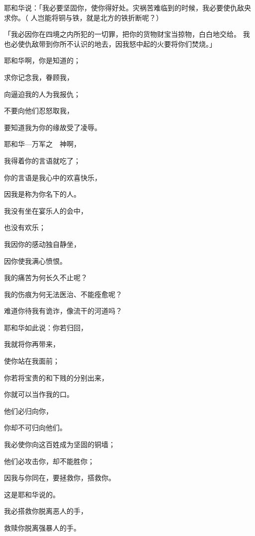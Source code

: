 {耶和华说：「我必要坚固你，使你得好处。灾祸苦难临到的时候，我必要使仇敌央求你。（
人岂能将铜与铁，就是北方的铁折断呢？）
\par }{\PP {}「我必因你在四境之内所犯的一切罪，把你的货物财宝当掠物，白白地交给{}。
我也必使仇敌带{}到你所不认识的地去，因我怒中起的火要将你们焚烧。」
\par }{\Q {}耶和华啊，你是知道的；
\par }{\Q 求你记念我，眷顾我，
\par }{\Q 向逼迫我的人为我报仇；
\par }{\Q 不要向他们忍怒取我{}，
\par }{\Q 要知道我为你的缘故受了凌辱。
\par }{\Q {}耶和华—万军之　神啊，
\par }{\Q 我得着你的言语就{}吃了；
\par }{\Q 你的言语是我心中的欢喜快乐，
\par }{\Q 因我是称为你名下的人。
\par }{\Q {}我没有坐在宴乐人的会中，
\par }{\Q 也没有欢乐；
\par }{\Q 我因你的感动独自静坐，
\par }{\Q 因你使我满心愤恨。
\par }{\Q {}我的痛苦为何长久不止呢？
\par }{\Q 我的伤痕为何无法医治、不能痊愈呢？
\par }{\Q 难道你待我有诡诈，像流干的河道吗？
\par }{\BB \par }{\Q {}耶和华如此说：你若归回，
\par }{\Q 我就将你再带来，
\par }{\Q 使你站在我面前；
\par }{\Q 你若将宝贵的和下贱的分别出来，
\par }{\Q 你就可以当作我的口。
\par }{\Q 他们必归向你，
\par }{\Q 你却不可归向他们。
\par }{\Q {}我必使你向这百姓成为坚固的铜墙；
\par }{\Q 他们必攻击你，却不能胜你；
\par }{\Q 因我与你同在，要拯救你，搭救你。
\par }{\Q 这是耶和华说的。
\par }{\Q {}我必搭救你脱离恶人的手，
\par }{\Q 救赎你脱离强暴人的手。

}
